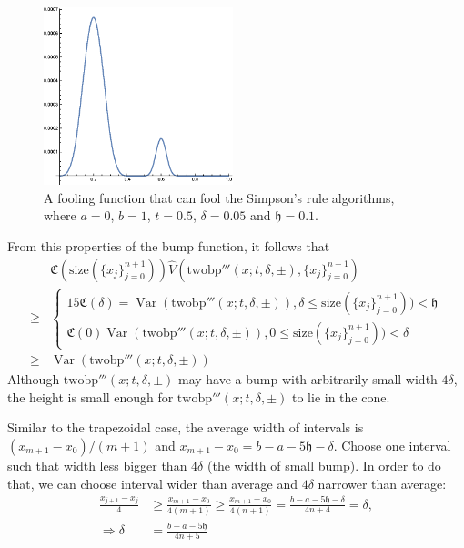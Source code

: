 \documentclass{iitthesis}
\DeclareMathOperator{\Var}{Var}
\theoremstyle{definition}
\theoremstyle{remark}
\begin{document}
\begin{figure}[h]
\centering
\includegraphics[width=5.5cm]{twobp.eps}
\caption{A fooling function that can fool the Simpson's rule algorithms, where $a=0$, $b=1$, $t=0.5$, $\delta=0.05$ and $\mathfrak{h}=0.1$. \label{fig:twobpfunction}}
\end{figure}

From this properties of the bump function, it follows that
\begin{align*}
  &\mathfrak{C}(\text{size}(\{x_j\}_{j=0}^{n+1}))\widehat{V}(\text{twobp}'''(x;t,\delta,\pm),\{x_j\}_{j=0}^{n+1})\\
  \ge & \begin{cases} \displaystyle 15\mathfrak{C}(\delta)=\Var(\text{twobp}'''(x;t,\delta,\pm)), \delta \le \text{size}(\{x_j\}_{j=0}^{n+1})) <\mathfrak{h}\\[1ex]
                      \displaystyle \mathfrak{C}(0)\Var(\text{twobp}'''(x;t,\delta,\pm)), 0\le \text{size}(\{x_j\}_{j=0}^{n+1}))<\delta
        \end{cases}\\
  \ge & \Var(\text{twobp}'''(x;t,\delta,\pm))
\end{align*}
Although $\text{twobp}'''(x;t,\delta,\pm)$ may have a bump with arbitrarily small width $4\delta$, the height is small enough for $\text{twobp}'''(x;t,\delta,\pm)$ to lie in the cone.

Similar to the trapezoidal case, the average width of intervals is $(x_{m+1}-x_{0})/(m+1)$ and $x_{m+1}-x_{0}=b-a-5\mathfrak{h}-\delta$. Choose one interval such that width less bigger than $4\delta$ (the width of small bump). In order to do that, we can choose interval wider than average and $4\delta$ narrower than average:
  \begin{align*}
    \frac{x_{j+1}-x_{j}}{4}&\ge\frac{x_{m+1}-x_{0}}{4(m+1)}\ge\frac{x_{m+1}-x_{0}}{4(n+1)}=\frac{b-a-5\mathfrak{h}-\delta}{4n+4}=\delta,\\
    \Rightarrow \delta&=\frac{b-a-5\mathfrak{h}}{4n+5}
  \end{align*}
\end{document}
